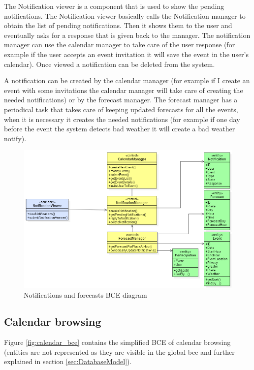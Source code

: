 \documentclass[10pt,a4paper,titlepage]{article}
\begin{document}
The Notification viewer is a component that is used to show the pending notifications. The Notification viewer basically calls the Notification manager to obtain the list of pending notifications. Then it shows them to the user and eventually asks for a response that is given back to the manager. The notification manager can use the calendar manager to take care of the user response (for example if the user accepts an event invitation it will save the event in the user's calendar). Once viewed a notification can be deleted from the system.

A notification can be created by the calendar manager (for example if I create an event with some invitations the calendar manager will take care of creating the needed notifications) or by the forecast manager. The forecast manager has a periodical task that takes care of keeping updated forecasts for all the events, when it is necessary it creates the needed notifications (for example if one day before the event the system detects bad weather it will create a bad weather notify).
\begin{figure}[h]
\centering
\includegraphics[width=\linewidth]{./bce/notification_bce}
\caption[notification bce]{Notifications and forecasts BCE diagram}
\label{fig:notification_bce}
\end{figure}

\subsection{Calendar browsing}
Figure \ref{fig:calendar_bce} contains the simplified BCE of calendar browsing (entities are not represented as they are visible in the global bce and further explained in section \ref{sec:DatabaseModel}).
\end{document}
